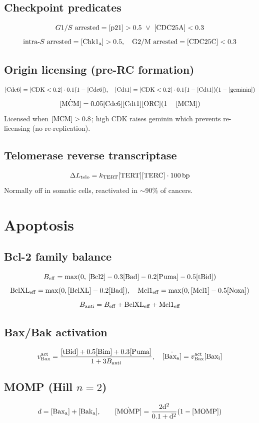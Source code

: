 \documentclass[11pt,a4paper]{article}
\newcommand{\eq}[1]{\begin{equation}#1\end{equation}}
\begin{document}
\subsection{Checkpoint predicates}
\[
G1/S\ \text{arrested} = [\rm p21]>0.5\ \lor\ [\rm CDC25A]<0.3
\]
\[
\text{intra-}S\ \text{arrested} = [\rm Chk1_a]>0.5,\quad G2/M\ \text{arrested} = [\rm CDC25C]<0.3
\]

\subsection{Origin licensing (pre-RC formation)}
\eq{ \dot{[\rm Cdc6]}= [\mathrm{CDK}<0.2]\cdot 0.1(1-[\rm Cdc6]),\quad \dot{[\rm Cdt1]}= [\mathrm{CDK}<0.2]\cdot 0.1(1-[\rm Cdt1])(1-[\rm geminin]) }
\eq{ \dot{[\rm MCM]}=0.05[\rm Cdc6][\rm Cdt1][\rm ORC](1-[\rm MCM]) }
Licensed when $[\rm MCM]>0.8$; high CDK raises geminin which prevents re-licensing (no re-replication).

\subsection{Telomerase reverse transcriptase}
\eq{ \Delta L_{\rm telo} = k_{\rm TERT}[\rm TERT][\rm TERC]\cdot 100\,\si{bp} }
Normally off in somatic cells, reactivated in $\sim$90\% of cancers.

\clearpage
\section{Apoptosis}
\label{sec:apop}

\subsection{Bcl-2 family balance}
\eq{ B_{\rm eff}=\max(0,\,[\rm Bcl2]-0.3[\rm Bad]-0.2[\rm Puma]-0.5[\rm tBid]) }
\eq{ \mathrm{BclXL}_{\rm eff}=\max(0,[\rm BclXL]-0.2[\rm Bad]),\quad \mathrm{Mcl1}_{\rm eff}=\max(0,[\rm Mcl1]-0.5[\rm Noxa]) }
\eq{ B_{\rm anti}=B_{\rm eff}+\mathrm{BclXL}_{\rm eff}+\mathrm{Mcl1}_{\rm eff} }

\subsection{Bax/Bak activation}
\eq{ v_{\rm Bax}^{\rm act}=\frac{[\rm tBid]+0.5[\rm Bim]+0.3[\rm Puma]}{1+3B_{\rm anti}},\quad \dot{[\rm Bax_a]}=v_{\rm Bax}^{\rm act}[\rm Bax_i] }

\subsection{MOMP (Hill $n=2$)}
\eq{ d=[\rm Bax_a]+[\rm Bak_a],\qquad \dot{[\rm MOMP]} = \frac{2 d^2}{0.1+d^2}(1-[\rm MOMP]) }
\end{document}
